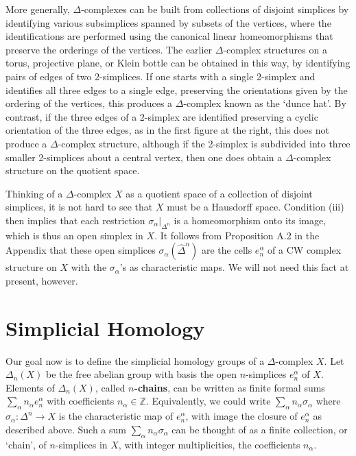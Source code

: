 More generally, $\Delta$-complexes can be built from collections of disjoint simplices by
identifying various subsimplices spanned by subsets of the vertices, where the identifications are performed using the canonical linear homeomorphisms that preserve
the orderings of the vertices. The earlier $\Delta$-complex structures on a torus, projective
plane, or Klein bottle can be obtained in this way, by identifying pairs of edges of
two 2-simplices. If one starts with a single 2-simplex and identifies all three edges
to a single edge, preserving the orientations given by the ordering of the vertices,
this produces a $\Delta$-complex known as the `dunce hat'. By contrast, if the three edges
of a 2-simplex are identified preserving a cyclic orientation of the three edges, as in
the first figure at the right, this does not produce a
$\Delta$-complex structure, although if the 2-simplex is
subdivided into three smaller 2-simplices about a
central vertex, then one does obtain a $\Delta$-complex
structure on the quotient space.

Thinking of a $\Delta$-complex $X$ as a quotient space of a collection of disjoint simplices, it is not hard to see that $X$ must be a Hausdorff space. Condition (iii) then
implies that each restriction $\sigma_\alpha|_{\Delta^n}$ is a homeomorphism onto its image, which is
thus an open simplex in $X$. It follows from Proposition A.2 in the Appendix that
these open simplices $\sigma_\alpha(\hat{\Delta}^n)$ are the cells $e^\alpha_n$ of a CW complex structure on $X$ with
the $\sigma_\alpha$'s as characteristic maps. We will not need this fact at present, however.

\section*{Simplicial Homology}

Our goal now is to define the simplicial homology groups of a $\Delta$-complex $X$. Let
$\Delta_n(X)$ be the free abelian group with basis the open $n$-simplices $e^\alpha_n$ of $X$. Elements
of $\Delta_n(X)$, called \textbf{$n$-chains}, can be written as finite formal sums $\sum_\alpha n_\alpha e^\alpha_n$ with coefficients $n_\alpha \in \mathbb{Z}$. Equivalently, we could write $\sum_\alpha n_\alpha \sigma_\alpha$ where $\sigma_\alpha:\Delta^n \to X$ is the
characteristic map of $e^\alpha_n$, with image the closure of $e^\alpha_n$ as described above. Such a
sum $\sum_\alpha n_\alpha\sigma_\alpha$ can be thought of as a finite collection, or `chain', of $n$-simplices in $X$,
with integer multiplicities, the coefficients $n_\alpha$.

